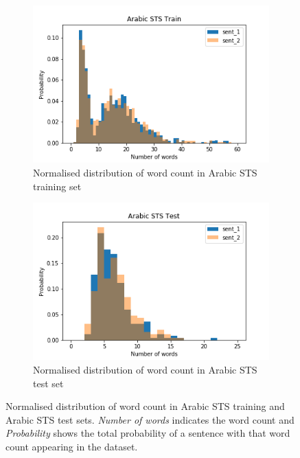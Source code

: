 \begin{enumerate}
\begin{figure}
	\captionsetup[subfigure]{justification=centering}
	\centering
	\begin{subfigure}[b]{.5\textwidth}
		\centering
		\includegraphics[width=\textwidth]{figures/semantic_textual_similarity/introduction/arabic_sts_train_words.png}
		\caption{Normalised distribution of word count in Arabic STS training set}
		\label{fig:arabic_sts_train_words}
	\end{subfigure}%
	\begin{subfigure}[b]{.5\textwidth}
		\centering
		\includegraphics[width=\textwidth]{figures/semantic_textual_similarity/introduction/arabic_sts_test_words.png}
		\caption{Normalised distribution of word count in Arabic STS test set}
		\label{fig:arabic_sts_test_words}
	\end{subfigure}
	\caption[Normalised distribution of word count in Arabic STS training and Arabic STS test sets.]{Normalised distribution of word count in Arabic STS training and Arabic STS test sets. \textit{Number of words} indicates the word count and \textit{Probability} shows the total probability of a sentence with that word count appearing in the dataset.}
	\label{fig:arabic_sts_words}
\end{figure}


\end{enumerate}
